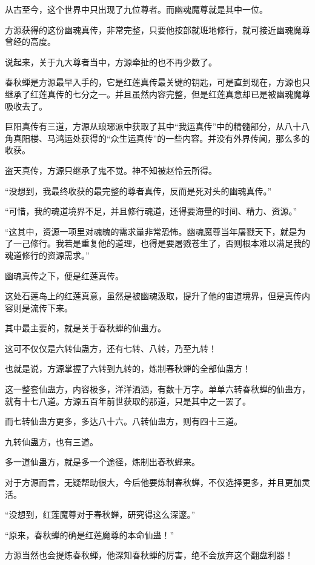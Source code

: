 \begin{this_body}
从古至今，这个世界中只出现了九位尊者。而幽魂魔尊就是其中一位。

方源获得的这份幽魂真传，非常完整，只要他按部就班地修行，就可接近幽魂魔尊曾经的高度。

说起来，关于九大尊者当中，方源牵扯的也不再少数了。

春秋蝉是方源最早入手的，它是红莲真传最关键的钥匙，可是直到现在，方源也只继承了红莲真传的七分之一。并且虽然内容完整，但是红莲真意却已是被幽魂魔尊吸收去了。

巨阳真传有三道，方源从琅琊派中获取了其中“我运真传”中的精髓部分，从八十八角真阳楼、马鸿运处获得的“众生运真传”的一些内容。并没有外界传闻，那么多的收获。

盗天真传，方源只继承了鬼不觉。神不知被赵怜云所得。

“没想到，我最终收获的最完整的尊者真传，反而是死对头的幽魂真传。”

“可惜，我的魂道境界不足，并且修行魂道，还得要海量的时间、精力、资源。”

“这其中，资源一项里对魂魄的需求量非常恐怖。幽魂魔尊当年屠戮天下，就是为了一己修行。我若是重复他的道理，也得是要屠戮苍生了，否则根本难以满足我的魂道修行的资源需求。”

幽魂真传之下，便是红莲真传。

这处石莲岛上的红莲真意，虽然是被幽魂汲取，提升了他的宙道境界，但是真传内容则是流传下来。

其中最主要的，就是关于春秋蝉的仙蛊方。

这可不仅仅是六转仙蛊方，还有七转、八转，乃至九转！

也就是说，方源掌握了六转到九转的，炼制春秋蝉的全部仙蛊方！

这一整套仙蛊方，内容极多，洋洋洒洒，有数十万字。单单六转春秋蝉的仙蛊方，就有十七八道。方源五百年前世获取的那道，只是其中之一罢了。

而七转仙蛊方更多，多达八十六。八转仙蛊方，则有四十三道。

九转仙蛊方，也有三道。

多一道仙蛊方，就是多一个途径，炼制出春秋蝉来。

对于方源而言，无疑帮助很大，今后他要炼制春秋蝉，不仅选择更多，并且更加灵活。

“没想到，红莲魔尊对于春秋蝉，研究得这么深邃。”

“原来，春秋蝉的确是红莲魔尊的本命仙蛊！”

方源当然也会提炼春秋蝉，他深知春秋蝉的厉害，绝不会放弃这个翻盘利器！


\end{this_body}
